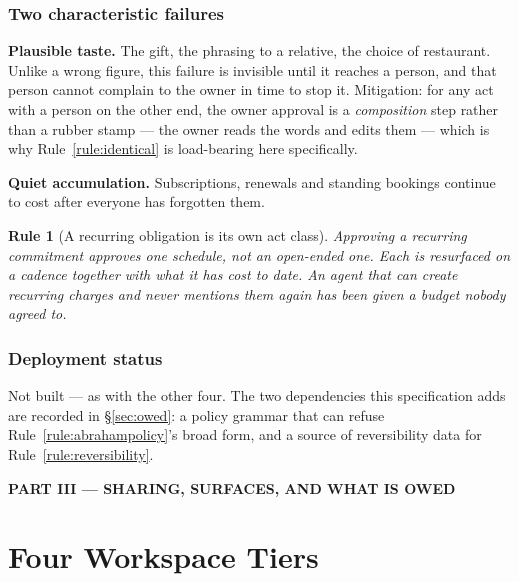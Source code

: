 \documentclass[11pt]{article}
\newtheorem{drule}{Rule}
\begin{document}
\subsubsection{Two characteristic failures}

\textbf{Plausible taste.} The gift, the phrasing to a relative, the choice of restaurant. Unlike a wrong figure, this failure is invisible until it reaches a person, and that person cannot complain to the owner in time to stop it. Mitigation: for any act with a person on the other end, the owner approval is a \emph{composition} step rather than a rubber stamp --- the owner reads the words and edits them --- which is why Rule~\ref{rule:identical} is load-bearing here specifically.

\textbf{Quiet accumulation.} Subscriptions, renewals and standing bookings continue to cost after everyone has forgotten them.

\begin{drule}[A recurring obligation is its own act class]
\label{rule:recurring}
Approving a recurring commitment approves \emph{one schedule}, not an open-ended one. Each is resurfaced on a cadence together with what it has cost to date. An agent that can create recurring charges and never mentions them again has been given a budget nobody agreed to.
\end{drule}

\subsubsection{Deployment status}

Not built --- as with the other four. The two dependencies this specification adds are recorded in \S\ref{sec:owed}: a policy grammar that can refuse Rule~\ref{rule:abrahampolicy}'s broad form, and a source of reversibility data for Rule~\ref{rule:reversibility}.

\newpage
\begin{center}\large\bfseries PART III --- SHARING, SURFACES, AND WHAT IS OWED\end{center}

\section{Four Workspace Tiers}
\label{sec:workspace}
\end{document}
